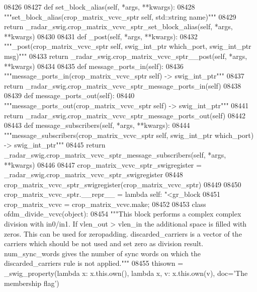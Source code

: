 \begin{DoxyCode}
{{{{{{{{{{{{{{{{{{{{{{{{{{{08426 
08427     \textcolor{keyword}{def }set_block_alias(self, *args, **kwargs):
08428         \textcolor{stringliteral}{"""set\_block\_alias(crop\_matrix\_vcvc\_sptr self, std::string name)"""}
08429         \textcolor{keywordflow}{return} \_radar\_swig.crop\_matrix\_vcvc\_sptr\_set\_block\_alias(self, *args, **kwargs)
08430 
08431     \textcolor{keyword}{def }_post(self, *args, **kwargs):
08432         \textcolor{stringliteral}{"""\_post(crop\_matrix\_vcvc\_sptr self, swig\_int\_ptr which\_port, swig\_int\_ptr msg)"""}
08433         \textcolor{keywordflow}{return} \_radar\_swig.crop\_matrix\_vcvc\_sptr\_\_post(self, *args, **kwargs)
08434 
08435     \textcolor{keyword}{def }message_ports_in(self):
08436         \textcolor{stringliteral}{"""message\_ports\_in(crop\_matrix\_vcvc\_sptr self) -> swig\_int\_ptr"""}
08437         \textcolor{keywordflow}{return} \_radar\_swig.crop\_matrix\_vcvc\_sptr\_message\_ports\_in(self)
08438 
08439     \textcolor{keyword}{def }message_ports_out(self):
08440         \textcolor{stringliteral}{"""message\_ports\_out(crop\_matrix\_vcvc\_sptr self) -> swig\_int\_ptr"""}
08441         \textcolor{keywordflow}{return} \_radar\_swig.crop\_matrix\_vcvc\_sptr\_message\_ports\_out(self)
08442 
08443     \textcolor{keyword}{def }message_subscribers(self, *args, **kwargs):
08444         \textcolor{stringliteral}{"""message\_subscribers(crop\_matrix\_vcvc\_sptr self, swig\_int\_ptr which\_port) -> swig\_int\_ptr"""}
08445         \textcolor{keywordflow}{return} \_radar\_swig.crop\_matrix\_vcvc\_sptr\_message\_subscribers(self, *args, **kwargs)
08446 
08447 crop\_matrix\_vcvc\_sptr\_swigregister = \_radar\_swig.crop\_matrix\_vcvc\_sptr\_swigregister
08448 crop_matrix_vcvc_sptr_swigregister(crop\_matrix\_vcvc\_sptr)
08449 
08450 crop\_matrix\_vcvc\_sptr.\_\_repr\_\_ = \textcolor{keyword}{lambda} self: \textcolor{stringliteral}{"<gr\_block %
08451 crop\_matrix\_vcvc = crop\_matrix\_vcvc.make;
08452 
08453 \textcolor{keyword}{class }ofdm_divide_vcvc(object):
08454     \textcolor{stringliteral}{"""This block performs a complex complex division with in0/in1. If vlen\_out > vlen\_in the additional
       space is filled with zeros. This can be used for zeropadding. discarded\_carriers is a vector of the carriers
       which should be not used and set zero as division result. num\_sync\_words gives the number of sync words on
       which the discarded\_carriers rule is not applied."""}
08455     thisown = _swig_property(\textcolor{keyword}{lambda} x: x.this.own(), \textcolor{keyword}{lambda} x, v: x.this.own(v), doc=\textcolor{stringliteral}{'The membership flag'})
}}}}}}}}}}}}}}}}}}}}}}}}}}}}
\end{DoxyCode}
